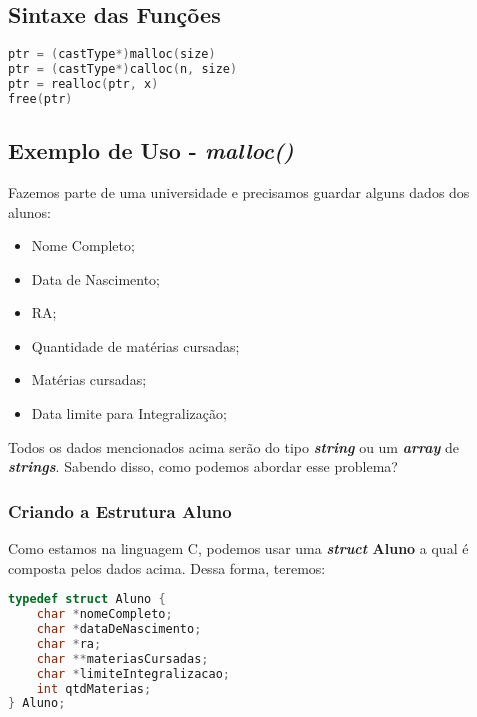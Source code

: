 \subsection{Sintaxe das Funções}
\begin{lstlisting}[language=C]
ptr = (castType*)malloc(size)
ptr = (castType*)calloc(n, size)
ptr = realloc(ptr, x)
free(ptr)
\end{lstlisting}

\subsection{Exemplo de Uso - \textit{malloc()}}
Fazemos parte de uma universidade e precisamos guardar alguns dados dos alunos:
\begin{itemize}
    \item Nome Completo;
    \item Data de Nascimento;
    \item RA;
    \item Quantidade de matérias cursadas;
    \item Matérias cursadas;
    \item Data limite para Integralização;
\end{itemize}

Todos os dados mencionados acima serão do tipo \textbf{\textit{string}} ou um \textbf{\textit{array}} de \textbf{\textit{strings}}. Sabendo disso, como podemos abordar esse problema?

\subsubsection{Criando a Estrutura Aluno}
Como estamos na linguagem C, podemos usar uma \textbf{\textit{struct} Aluno} a qual é composta pelos dados acima. Dessa forma, teremos:
\begin{lstlisting}[language=C]
typedef struct Aluno {
    char *nomeCompleto;
    char *dataDeNascimento;
    char *ra;
    char **materiasCursadas;
    char *limiteIntegralizacao;
    int qtdMaterias;
} Aluno;
\end{lstlisting}

